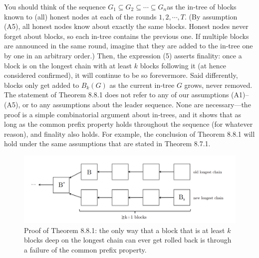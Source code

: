 You should think of the sequence $G_1 \subseteq G_2 \subseteq \cdots\subseteq G_n$as the in-tree of blocks known to
(all) honest nodes at each of the rounds $1, 2,\cdots, T$. (By assumption (A5), all honest nodes
know about exactly the same blocks. Honest nodes never forget about blocks, so each in-tree
contains the previous one. If multiple blocks are announced in the same round, imagine that
they are added to the in-tree one by one in an arbitrary order.) Then, the expression (5)
asserts finality: once a block is on the longest chain with at least $k$ blocks following it (at
hence considered confirmed), it will continue to be so forevermore. Said differently, blocks
only get added to $B_k(G)$ as the current in-tree $G$ grows, never removed.
The statement of Theorem 8.8.1 does not refer to any of our assumptions (A1)–(A5), or to
any assumptions about the leader sequence. None are necessary—the proof is a simple combinatorial argument about in-trees, and it shows that as long as the common prefix property
holds throughout the sequence (for whatever reason), and finality also holds. For example, the
conclusion of Theorem 8.8.1 will hold under the same assumptions that are stated in Theorem 8.7.1.\\
\begin{figure}[h]
    \centering
    \includegraphics[scale = 0.5]{figures/f30.png}
    \caption{Proof of Theorem 8.8.1: the only way that a block that is at least $k$ blocks deep on
the longest chain can ever get rolled back is through a failure of the common prefix property.
}
    \label{fig:mesh1}
\end{figure}\\


